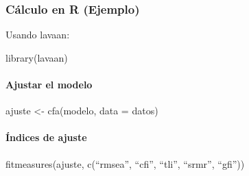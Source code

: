 \documentclass[
]{article}
\begin{document}
\subsubsection{Cálculo en R (Ejemplo)}\label{cuxe1lculo-en-r-ejemplo}

Usando lavaan:

library(lavaan)

\paragraph{Ajustar el modelo}\label{ajustar-el-modelo}

ajuste \textless- cfa(modelo, data = datos)

\paragraph{Índices de ajuste}\label{uxedndices-de-ajuste}

fitmeasures(ajuste, c(``rmsea'', ``cfi'', ``tli'', ``srmr'', ``gfi''))
\end{document}
